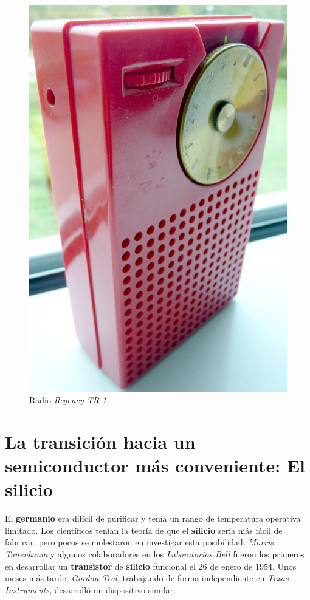 \begin{figure}[htb]
	\centering
	\includegraphics[scale = 0.2]{Graphics/Regency_TR-1_radio.jpg}
	\caption{Radio \emph{Regency TR-1}.}
	\label{fig:4}
\end{figure}
\newpage

\section{La transición hacia un semiconductor más conveniente: El silicio}
El \textbf{germanio} era difícil de purificar y tenía un rango de temperatura operativa limitado. Los científicos tenían la teoría de que el \textbf{silicio}
sería más fácil de fabricar, pero pocos se molestaron en investigar esta posibilidad. \emph{Morris Tanenbaum} y algunos colaboradores en los \emph{Laboratorios Bell}
fueron los primeros en desarrollar un \textbf{transistor} de \textbf{silicio} funcional el 26 de enero de 1954. Unos meses más tarde, \emph{Gordon Teal}, trabajando
de forma independiente en \emph {Texas Instruments}, desarrolló un dispositivo similar.\\

